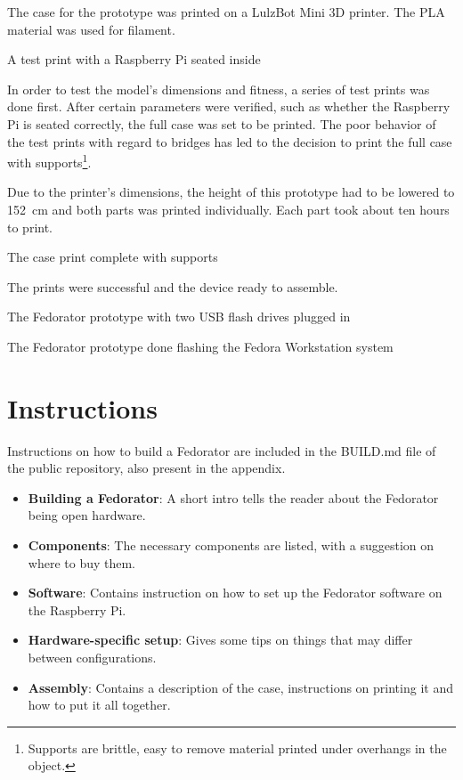         The case for the prototype was printed on a LulzBot Mini \cite{lulzbot-mini} 3D printer.  The PLA material was used for filament.
        
            {A test print with a Raspberry Pi seated inside}
        
        In order to test the model's dimensions and fitness, a series of test prints was done first.  After certain parameters were verified, such as whether the Raspberry Pi is seated correctly, the full case was set to be printed.  The poor behavior of the test prints with regard to bridges has led to the decision to print the full case with supports\footnote{Supports are brittle, easy to remove material printed under overhangs in the object.}.
        
        Due to the printer's dimensions, the height of this prototype had to be lowered to 152~cm and both parts was printed individually.  Each part took about ten hours to print.%
        
            {The case print complete with supports}
        
        The prints were successful and the device ready to assemble.
        
        \newpage
        
        
            {The Fedorator prototype with two USB flash drives plugged in}
            
            {The Fedorator prototype done flashing the Fedora Workstation system}
        
        \newpage
        
        
    \section{Instructions}
        Instructions on how to build a Fedorator are included in the BUILD.md file of the public repository, also present in the appendix.
        
        \begin{itemize}
            \item \textbf{Building a Fedorator}: A short intro tells the reader about the Fedorator being open hardware.
            \item \textbf{Components}: The necessary components are listed, with a suggestion on where to buy them.
            \item \textbf{Software}: Contains instruction on how to set up the Fedorator software on the Raspberry Pi.
            \item \textbf{Hardware-specific setup}: Gives some tips on things that may differ between configurations.
            \item \textbf{Assembly}: Contains a description of the case, instructions on printing it and how to put it all together.
        \end{itemize}
        
